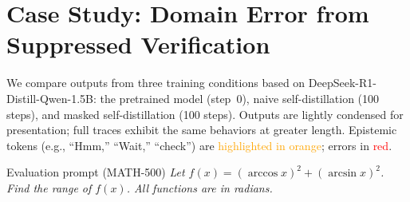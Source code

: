\documentclass[11pt]{article}
\begin{document}
\onecolumn
\section{Case Study: Domain Error from Suppressed Verification}
\label{app:case}
\vspace{-1.1\baselineskip}
We compare outputs from three training conditions based on DeepSeek-R1-Distill-Qwen-1.5B: the pretrained model (step~0), naive self-distillation (100 steps), and masked self-distillation (100 steps). Outputs are lightly condensed for presentation; full traces exhibit the same behaviors at greater length.
Epistemic tokens (e.g., ``Hmm,'' ``Wait,'' ``check'') are \textcolor{orange}{highlighted in orange}; errors in \textcolor{red}{red}.
\vspace{-2pt}
\begin{problemblock}{Evaluation prompt (MATH-500)}
\textit{Let \(f(x) = (\arccos x)^2 + (\arcsin x)^2\). Find the range of \(f(x)\). All functions are in radians.}

\end{problemblock}
\end{document}
